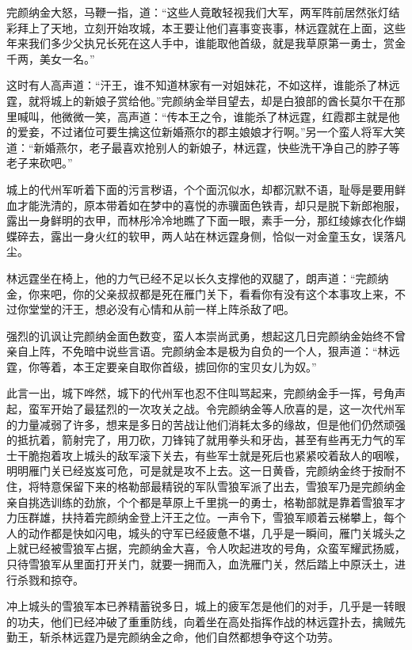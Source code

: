 完颜纳金大怒，马鞭一指，道：“这些人竟敢轻视我们大军，两军阵前居然张灯结彩拜上了天地，立刻开始攻城，本王要让他们喜事变丧事，林远霆就在上面，这些年来我们多少父执兄长死在这人手中，谁能取他首级，就是我草原第一勇士，赏金千两，美女一名。”

这时有人高声道：“汗王，谁不知道林家有一对姐妹花，不如这样，谁能杀了林远霆，就将城上的新娘子赏给他。”完颜纳金举目望去，却是白狼部的酋长莫尔干在那里喊叫，他微微一笑，高声道：“传本王之令，谁能杀了林远霆，红霞郡主就是他的爱妾，不过诸位可要生擒这位新婚燕尔的郡主娘娘才行啊。”另一个蛮人将军大笑道：“新婚燕尔，老子最喜欢抢别人的新娘子，林远霆，快些洗干净自己的脖子等老子来砍吧。”

城上的代州军听着下面的污言秽语，个个面沉似水，却都沉默不语，耻辱是要用鲜血才能洗清的，原本带着如在梦中的喜悦的赤骥面色铁青，却只是脱下新郎袍服，露出一身鲜明的衣甲，而林彤冷冷地瞧了下面一眼，素手一分，那红绫嫁衣化作蝴蝶碎去，露出一身火红的软甲，两人站在林远霆身侧，恰似一对金童玉女，误落凡尘。

林远霆坐在椅上，他的力气已经不足以长久支撑他的双腿了，朗声道：“完颜纳金，你来吧，你的父亲叔叔都是死在雁门关下，看看你有没有这个本事攻上来，不过你堂堂的汗王，想必没有心情和从前一样上阵杀敌了吧。

强烈的讥讽让完颜纳金面色数变，蛮人本崇尚武勇，想起这几日完颜纳金始终不曾亲自上阵，不免暗中说些言语。完颜纳金本是极为自负的一个人，狠声道：“林远霆，你等着，本王定要亲自取你首级，掳回你的宝贝女儿为奴。”

此言一出，城下哗然，城下的代州军也忍不住叫骂起来，完颜纳金手一挥，号角声起，蛮军开始了最猛烈的一次攻关之战。令完颜纳金等人欣喜的是，这一次代州军的力量减弱了许多，想来是多日的苦战让他们消耗太多的缘故，但是他们仍然顽强的抵抗着，箭射完了，用刀砍，刀锋钝了就用拳头和牙齿，甚至有些再无力气的军士干脆抱着攻上城头的敌军滚下关去，有些军士就是死后也紧紧咬着敌人的咽喉，明明雁门关已经岌岌可危，可是就是攻不上去。这一日黄昏，完颜纳金终于按耐不住，将特意保留下来的格勒部最精锐的军队雪狼军派了出去，雪狼军乃是完颜纳金亲自挑选训练的劲旅，个个都是草原上千里挑一的勇士，格勒部就是靠着雪狼军才力压群雄，扶持着完颜纳金登上汗王之位。一声令下，雪狼军顺着云梯攀上，每个人的动作都是快如闪电，城头的守军已经疲惫不堪，几乎是一瞬间，雁门关城头之上就已经被雪狼军占据，完颜纳金大喜，令人吹起进攻的号角，众蛮军耀武扬威，只待雪狼军从里面打开关门，就要一拥而入，血洗雁门关，然后踏上中原沃土，进行杀戮和掠夺。

冲上城头的雪狼军本已养精蓄锐多日，城上的疲军怎是他们的对手，几乎是一转眼的功夫，他们已经冲破了重重防线，向着坐在高处指挥作战的林远霆扑去，擒贼先勤王，斩杀林远霆乃是完颜纳金之命，他们自然都想争夺这个功劳。

